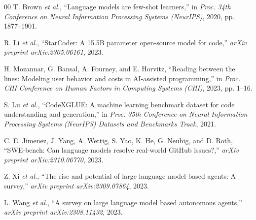 \documentclass[conference]{IEEEtran}
\begin{document}
\begin{thebibliography}{00}
T. Brown \textit{et al.}, ``Language models are few-shot learners,'' in \textit{Proc. 34th Conference on Neural Information Processing Systems (NeurIPS)}, 2020, pp. 1877--1901.

R. Li \textit{et al.}, ``StarCoder: A 15.5B parameter open-source model for code,'' \textit{arXiv preprint arXiv:2305.06161}, 2023.

H. Mozannar, G. Bansal, A. Fourney, and E. Horvitz, ``Reading between the lines: Modeling user behavior and costs in AI-assisted programming,'' in \textit{Proc. CHI Conference on Human Factors in Computing Systems (CHI)}, 2023, pp. 1--16.

S. Lu \textit{et al.}, ``CodeXGLUE: A machine learning benchmark dataset for code understanding and generation,'' in \textit{Proc. 35th Conference on Neural Information Processing Systems (NeurIPS) Datasets and Benchmarks Track}, 2021.

C. E. Jimenez, J. Yang, A. Wettig, S. Yao, K. He, G. Neubig, and D. Roth, ``SWE-bench: Can language models resolve real-world GitHub issues?,'' \textit{arXiv preprint arXiv:2310.06770}, 2023.

Z. Xi \textit{et al.}, ``The rise and potential of large language model based agents: A survey,'' \textit{arXiv preprint arXiv:2309.07864}, 2023.

L. Wang \textit{et al.}, ``A survey on large language model based autonomous agents,'' \textit{arXiv preprint arXiv:2308.11432}, 2023.

\end{thebibliography}
\end{document}
